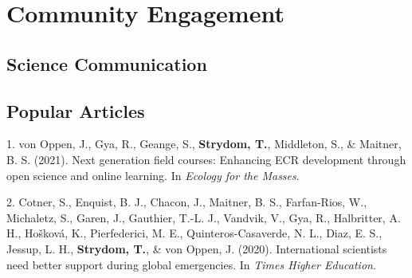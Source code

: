 \documentclass[11pt,a4paper,]{awesome-cv}
\newlength{\cslhangindent}
\newenvironment{CSLReferences}[2] %
 {\begin{list}{}{%
  \setlength{\itemindent}{0pt}
  \setlength{\leftmargin}{0pt}
  \setlength{\parsep}{0pt}
  \ifodd #1
   \setlength{\leftmargin}{\cslhangindent}
   \setlength{\itemindent}{-1\cslhangindent}
  \fi
  \setlength{\itemsep}{#2\baselineskip}}}
 {\end{list}}
\begin{document}
\newpage

\section{\texorpdfstring{ Community
Engagement}{ Community Engagement}}\label{community-engagement}

\vspace{\baselineskip}

\subsection{\texorpdfstring{\textbf{Science
Communication}}{Science Communication}}\label{science-communication}

\begin{cventries}
    \vspace{-4.0mm}
\end{cventries}
\vspace{\baselineskip}

\subsection{\texorpdfstring{\textbf{Popular
Articles}}{Popular Articles}}\label{popular-articles}

\label{refs-83b26223daf8352e213dd849388eea17}
\begin{CSLReferences}{1}{0}
1. von Oppen, J., Gya, R., Geange, S., \textbf{Strydom, T.}, Middleton,
S., \& Maitner, B. S. (2021). Next generation field courses: Enhancing
ECR development through open science and online learning. In
\emph{Ecology for the Masses}.

2. Cotner, S., Enquist, B. J., Chacon, J., Maitner, B. S., Farfan-Rios,
W., Michaletz, S., Garen, J., Gauthier, T.-L. J., Vandvik, V., Gya, R.,
Halbritter, A. H., Hošková, K., Pierfederici, M. E.,
Quinteros-Casaverde, N. L., Diaz, E. S., Jessup, L. H.,
\textbf{Strydom, T.}, \& von Oppen, J. (2020). International scientists
need better support during global emergencies. In \emph{Times Higher
Education}.

\end{CSLReferences}
\end{document}
